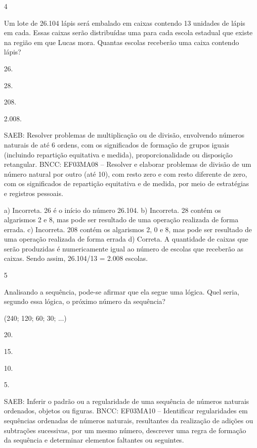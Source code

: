 \begin{multicols}{2}
{\begin{escolha}
{\num{4}

Um lote de 26.104 lápis será embalado em caixas contendo 13 unidades de
lápis em cada. Essas caixas serão distribuídas uma para cada escola
estadual que existe na região em que Lucas mora. Quantas escolas
receberão uma caixa contendo lápis?

\begin{escolha}
\item
  26.
\item
  28.
\item
  208.
\item
  2.008.
\end{escolha}

SAEB: Resolver problemas de multiplicação ou de divisão, envolvendo números naturais de até 6 ordens, com os significados de formação de grupos iguais (incluindo repartição equitativa e medida), proporcionalidade ou disposição retangular.
BNCC: EF03MA08 -- Resolver e elaborar problemas de divisão de um número natural por outro (até
10), com resto zero e com resto diferente de zero, com os significados de repartição equitativa
e de medida, por meio de estratégias e registros pessoais.

a) Incorreta. 26 é o início do número 26.104.
b) Incorreta. 28 contém os algarismos 2 e 8, mas pode ser resultado de uma operação realizada de forma errada.
c) Incorreta. 208 contém os algarismos 2, 0 e 8, mas pode ser resultado de uma operação realizada de forma errada
d) Correta. A quantidade de caixas que serão produzidas é numericamente igual ao número de
escolas que receberão as caixas. Sendo assim, 26.104/13 = 2.008 escolas.

\num{5}

Analisando a sequência, pode-se afirmar que ela segue uma lógica. Quel seria, segundo essa lógica, o próximo número da sequência?

(240; 120; 60; 30; ...)

\begin{escolha}
\item
  20.
\item
  15.
\item
  10.
\item
  5.
\end{escolha}

SAEB: Inferir o padrão ou a regularidade de uma sequência de números naturais ordenados, objetos ou figuras.
BNCC: EF03MA10 -- Identificar regularidades em sequências ordenadas de números naturais,
resultantes da realização de adições ou subtrações sucessivas, por um mesmo número,
descrever uma regra de formação da sequência e determinar elementos faltantes ou seguintes.

}
\end{escolha}}
\end{multicols}
